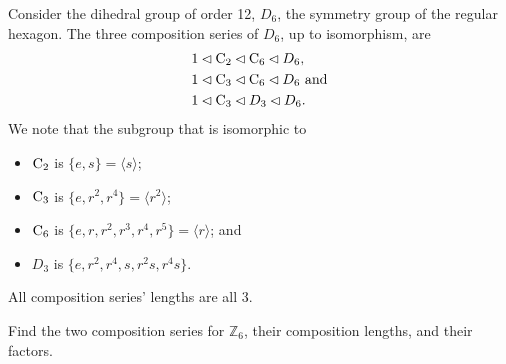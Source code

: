 \begin{example}
    Consider the dihedral group of order 12, $D_6$, the symmetry group of the regular hexagon. The three composition series of $D_6$, up to isomorphism, are
    \begin{align*}
        &1 \lhd \mathrm{C}_{2} \lhd \mathrm{C}_{6} \lhd D_6,\\
        &1 \lhd \mathrm{C}_{3} \lhd \mathrm{C}_{6} \lhd D_6 \text{ and}\\
        &1 \lhd \mathrm{C}_{3} \lhd D_3 \lhd D_6.
    \end{align*}
    We note that the subgroup that is isomorphic to
    \begin{itemize}
        \item $\mathrm{C}_{2}$ is $\{e, s\} = \langle s \rangle$;
        \item $\mathrm{C}_{3}$ is $\{e, r^2, r^4\} = \langle r^2\rangle$;
        \item $\mathrm{C}_{6}$ is $\{e, r, r^2, r^3, r^4, r^5\} = \langle r\rangle$; and
        \item $D_3$ is $\{e, r^2, r^4, s, r^2s, r^4s\}$.
    \end{itemize}
    All composition series' lengths are all 3.
\end{example}

\begin{exercise}
    Find the two composition series for $\mathbb{Z}_6$, their composition lengths, and their factors.
\end{exercise}

\newpage

